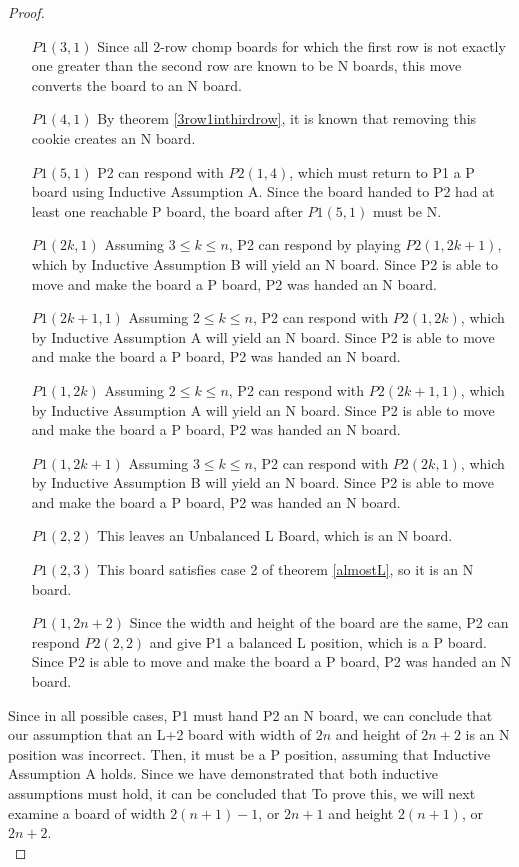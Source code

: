 \documentclass{amsart}
\theoremstyle{definition}
\theoremstyle{remark}
\numberwithin{equation}{section}
\begin{document}
\begin{proof}
\begin{itemize}
	\item[$P1(3, 1)$] Since all 2-row chomp boards for which the first row is not exactly one greater than the second row are known to be N boards, this move converts the board to an N board.
    \item[$P1(4, 1)$] By theorem \ref{3row1inthirdrow}, it is known that removing this cookie creates an N board.
    \item[$P1(5,1)$] P2 can respond with $P2(1,4)$, which must return to P1 a P board using Inductive Assumption A.  Since the board handed to P2 had at least one reachable P board, the board after $P1(5,1)$ must be N.
    \item [$P1(2k,1)$] Assuming $3 \leq k \leq n$, P2 can respond by playing $P2(1, 2k+1)$, which by Inductive Assumption B will yield an N board.  Since P2 is able to move and make the board a P board, P2 was handed an N board.
    \item [$P1(2k+1, 1)$] Assuming $2\leq k \leq n$, P2 can respond with $P2(1, 2k)$, which by Inductive Assumption A will yield an N board.  Since P2 is able to move and make the board a P board, P2 was handed an N board.
    \item [$P1(1, 2k)$] Assuming $2 \leq k \leq n$, P2 can respond with $P2(2k+1, 1)$, which by Inductive Assumption A will yield an N board.  Since P2 is able to move and make the board a P board, P2 was handed an N board.
    \item [$P1(1, 2k+1)$] Assuming $3 \leq k \leq n$, P2 can respond with $P2(2k, 1)$, which by Inductive Assumption B will yield an N board.  Since P2 is able to move and make the board a P board, P2 was handed an N board.
    \item [$P1(2, 2)$] This leaves an Unbalanced L Board, which is an N board.
    \item [$P1(2, 3)$] This board satisfies case 2 of theorem \ref{almostL}, so it is an N board.
    \item [$P1(1, 2n+2)$] Since the width and height of the board are the same, P2 can respond $P2(2, 2)$ and give P1 a balanced L position, which is a P board.  Since P2 is able to move and make the board a P board, P2 was handed an N board.
\end{itemize}
    
    Since in all possible cases, P1 must hand P2 an N board, we can conclude that our assumption that an L+2 board with width of $2n$ and height of $2n+2$ is an N position was incorrect.  Then, it must be a P position, assuming that Inductive Assumption A holds.  Since we have demonstrated that both inductive assumptions must hold, it can be concluded that  To prove this, we will next examine a board of width $2(n+1)-1$, or $2n+1$ and height $2(n+1)$, or $2n+2$.\\
\end{proof}
\end{document}
